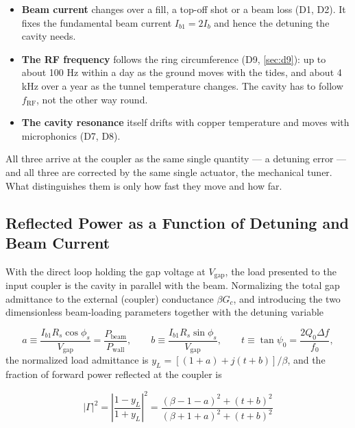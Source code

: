 \begin{itemize}
\tightlist
\item
  \textbf{Beam current} changes over a fill, a top-off shot or a beam loss (D1, D2). It fixes the fundamental beam current \(I_{b1} = 2I_b\) and hence the detuning the cavity needs.
\item
  \textbf{The RF frequency} follows the ring circumference (D9, \cref{sec:d9}): up to about 100 Hz within a day as the ground moves with the tides, and about 4 kHz over a year as the tunnel temperature changes. The cavity has to follow \(f_\text{RF}\), not the other way round.
\item
  \textbf{The cavity resonance} itself drifts with copper temperature and moves with microphonics (D7, D8).
\end{itemize}

All three arrive at the coupler as the same single quantity --- a detuning error --- and all three are corrected by the same single actuator, the mechanical tuner. What distinguishes them is only how fast they move and how far.

\subsection{Reflected Power as a Function of Detuning and Beam Current}\label{sec:transient-gamma}


With the direct loop holding the gap voltage at \(V_\text{gap}\), the load presented to the input coupler is the cavity in parallel with the beam. Normalizing the total gap admittance to the external (coupler) conductance \(\beta G_c\), and introducing the two dimensionless beam-loading parameters together with the detuning variable

\begin{equation}\label{eq:blparams}
a \equiv \frac{I_{b1} R_s \cos\phi_s}{V_\text{gap}} = \frac{P_\text{beam}}{P_\text{wall}},
\qquad
b \equiv \frac{I_{b1} R_s \sin\phi_s}{V_\text{gap}},
\qquad
t \equiv \tan\psi_0 = \frac{2 Q_0 \Delta f}{f_0},
\end{equation}
the normalized load admittance is \(y_L = \left[(1+a) + j(t+b)\right]/\beta\), and the fraction of forward power reflected at the coupler is

\begin{equation}\label{eq:gamma}
|\Gamma|^2 = \left\lvert\frac{1-y_L}{1+y_L}\right\rvert^2
 = \frac{(\beta - 1 - a)^2 + (t+b)^2}{(\beta + 1 + a)^2 + (t+b)^2}
\end{equation}

